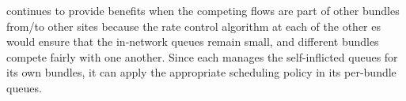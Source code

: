 \vspace{2pt}
\name continues to provide benefits when the competing flows are part of other bundles from/to other sites because the rate control algorithm at each of the other {\inbox}es would ensure that the in-network queues remain small, and different bundles compete fairly with one another. Since each \inbox manages the self-inflicted queues for its own bundles, it can apply the appropriate scheduling policy in its per-bundle queues.

